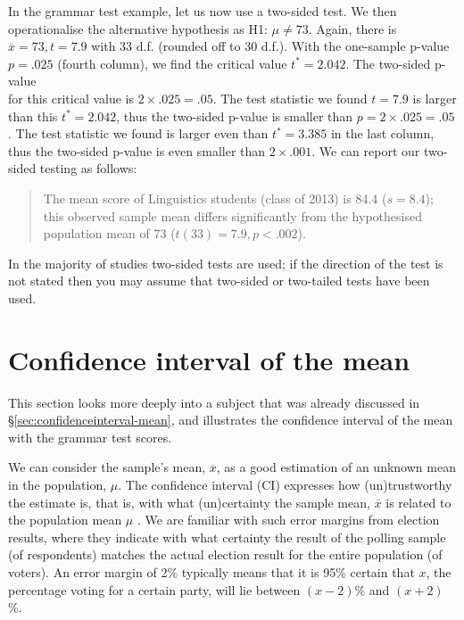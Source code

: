 \documentclass[
]{book}
\begin{document}
In the grammar test example, let us now use a two-sided test. We
then operationalise the alternative hypothesis as H1: \(\mu \ne 73\).
Again, there is \(\overline{x}=73, t=7.9\) with 33 d.f. (rounded off to 30 d.f.).
With the one-sample p-value \(p=.025\) (fourth column), we find
the critical value \(t^*=2.042\). The two-sided p-value\\
for this critical value is \(2 \times .025 = .05\). The test statistic we found
\(t=7.9\) is larger than this \(t^*=2.042\), thus the two-sided
p-value is smaller than \(p=2\times.025=.05\). The test statistic we found
is larger even than \(t^*=3.385\) in the last column,
thus the two-sided p-value is even smaller than
\(2\times.001\). We can report our two-sided testing as
follows:

\begin{quote}
The mean score of Linguistics students (class of 2013) is
84.4 (\(s=8.4\)); this observed sample mean differs significantly from the hypothesised
population mean of 73 (\(t(33)=7.9, p<.002\)).
\end{quote}

In the majority of studies two-sided tests are used; if the direction
of the test is not stated then you may assume that two-sided or two-tailed tests
have been used.

\hypertarget{sec:t-confidenceinterval-mean}{%
\section{Confidence interval of the mean}\label{sec:t-confidenceinterval-mean}}

This section looks more deeply into a subject that was already discussed in
§\ref{sec:confidenceinterval-mean}, and illustrates the confidence interval
of the mean with the grammar test scores.

We can consider the sample's mean, \(\overline{x}\), as a good estimation
of an unknown mean in the population,
\(\mu\). The confidence interval (CI) expresses how
(un)trustworthy the estimate is, that is,
with what (un)certainty the sample mean, \(\overline{x}\) is related to the population mean \(\mu\) \citep{Cumm12}.
We are familiar with such error margins
from election results, where they indicate with what certainty the result
of the polling sample (of respondents) matches the actual election result for the entire population (of voters). An
error margin of 2\% typically means that it is 95\% certain that \(x\), the percentage voting
for a certain party, will lie between \((x-2)\)\% and \((x+2)\)\%.
\end{document}
